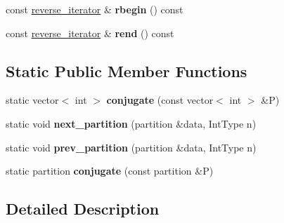 \begin{DoxyCompactItemize}
\item 
\hypertarget{classdscr_1_1basic__partitions_ac493587418c428f935b9ce33f5894536}{const \hyperlink{classdscr_1_1basic__partitions_1_1reverse__iterator}{reverse\-\_\-iterator} \& {\bfseries rbegin} () const }\label{classdscr_1_1basic__partitions_ac493587418c428f935b9ce33f5894536}

\item 
\hypertarget{classdscr_1_1basic__partitions_ac6d96b6e04827561635b8ac9c5339843}{const \hyperlink{classdscr_1_1basic__partitions_1_1reverse__iterator}{reverse\-\_\-iterator} \& {\bfseries rend} () const }\label{classdscr_1_1basic__partitions_ac6d96b6e04827561635b8ac9c5339843}

\end{DoxyCompactItemize}
\subsection*{Static Public Member Functions}
\begin{DoxyCompactItemize}
\item 
\hypertarget{classdscr_1_1basic__partitions_afd91ce7ada04ee89330923889dacb147}{static vector$<$ int $>$ {\bfseries conjugate} (const vector$<$ int $>$ \&P)}\label{classdscr_1_1basic__partitions_afd91ce7ada04ee89330923889dacb147}

\item 
\hypertarget{classdscr_1_1basic__partitions_a44f2fa1a88b532ccb353fb690604e06a}{static void {\bfseries next\-\_\-partition} (partition \&data, Int\-Type n)}\label{classdscr_1_1basic__partitions_a44f2fa1a88b532ccb353fb690604e06a}

\item 
\hypertarget{classdscr_1_1basic__partitions_aac2c8cd7f779665d3b33000cb223135e}{static void {\bfseries prev\-\_\-partition} (partition \&data, Int\-Type n)}\label{classdscr_1_1basic__partitions_aac2c8cd7f779665d3b33000cb223135e}

\item 
\hypertarget{classdscr_1_1basic__partitions_a6d167454ab3580a5acfee00c024232d3}{static partition {\bfseries conjugate} (const partition \&P)}\label{classdscr_1_1basic__partitions_a6d167454ab3580a5acfee00c024232d3}

\end{DoxyCompactItemize}


\subsection{Detailed Description}
